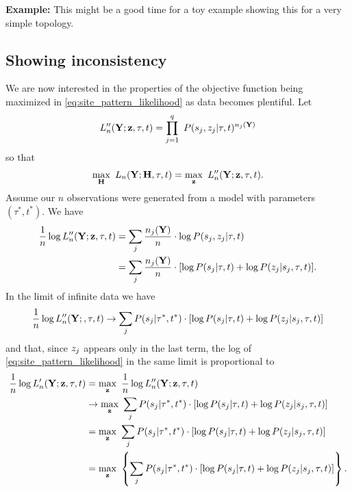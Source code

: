 \documentclass[a4paper]{article}
\begin{document}
\textbf{Example:} This might be a good time for a toy example showing this for a very simple topology.


\subsection{Showing inconsistency}

We are now interested in the properties of the objective function being maximized in \eqref{eq:site_pattern_likelihood} as data becomes plentiful.
Let
$$
L_n''(\mathbf{Y};\mathbf{z},\tau,t) = \prod_{j=1}^q \ P(s_j, z_j | \tau, t)^{n_j(\mathbf{Y})}
$$
so that
$$
\max_{\fullAncestralStates} \ L_n(\fullAlignment;\fullAncestralStates, \tau, t) =
    \max_{\fullAncestralStateCategories} \ L_n''(\fullAlignment;\fullAncestralStateCategories,\tau,t).
$$
Assume our $n$ observations were generated from a model with parameters $(\tau^*, t^*)$.
We have
\begin{align}
    \frac{1}{n} \log L_n''(\mathbf{Y};\mathbf{z},\tau,t)
        &= \sum_{j} \frac{n_j(\mathbf{Y})}{n}\cdot  \log P(s_j, z_j | \tau, t) \\
        &= \sum_{j} \frac{n_j(\mathbf{Y})}{n}\cdot [\log P(s_j | \tau, t) + \log P(z_j | s_j, \tau, t)].
\end{align}
In the limit of infinite data we have
$$
\frac{1}{n} \log L_n''(\mathbf{Y};,\tau,t) \rightarrow \sum_{j} P(s_j | \tau^*, t^*) \cdot [\log P(s_j | \tau, t) + \log P(z_j | s_j, \tau, t)]
$$
and that, since $z_j$ appears only in the last term, the log of \eqref{eq:site_pattern_likelihood} in the same limit is proportional to
\begin{align}
\frac{1}{n} \log L_n'(\mathbf{Y};\mathbf{z},\tau, t)
    &= \max_{\mathbf{z}} \ \frac{1}{n} \log L_n''(\mathbf{Y};\mathbf{z},\tau,t) \nonumber \\
    &\rightarrow \max_{\mathbf{z}} \ \sum_{j} P(s_j | \tau^*, t^*) \cdot [\log P(s_j | \tau, t) + \log P(z_j | s_j, \tau, t)] \nonumber \\
    &= \max_{\mathbf{z}} \ \sum_{j} P(s_j | \tau^*, t^*) \cdot [\log P(s_j | \tau, t) + \log P(z_j | s_j, \tau, t)] \nonumber \\
    &= \max_{\mathbf{z}} \ \left\{\sum_{j} P(s_j | \tau^*, t^*) \cdot \left[\log P(s_j | \tau, t) + \log P(z_j | s_j, \tau, t)\right]\right\}. \label{eq:site_pattern_profile_likelihood_mean}
\end{align}
\end{document}
